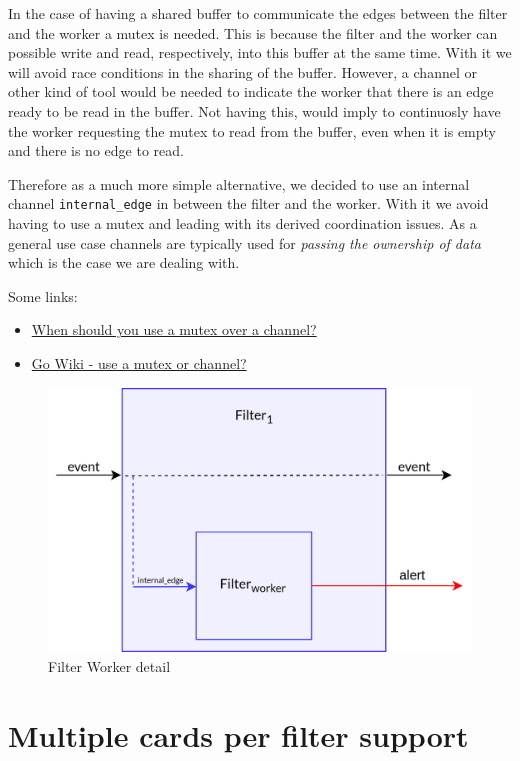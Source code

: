 \documentclass{article}
\begin{document}
In the case of having a shared buffer to communicate the edges between the filter and the worker a mutex is needed. This is because the filter and the worker can possible write and read, respectively, into this buffer at the same time. With it we will avoid race conditions in the sharing of the buffer. However, a channel or other kind of tool would be needed to indicate the worker that there is an edge ready to be read in the buffer. Not having this, would imply to continuosly have the worker requesting the mutex to read from the buffer, even when it is empty and there is no edge to read. 

Therefore as a much more simple alternative, we decided to use an internal channel \texttt{internal\_edge} in between the filter and the worker. With it we avoid having to use a mutex and leading with its derived coordination issues. As a general use case channels are typically used for \emph{passing the ownership of data} which is the case we are dealing with.

Some links:
\begin{itemize}
  \item \href{https://stackoverflow.com/questions/47312029/when-should-you-use-a-mutex-over-a-channel}{When should you use a mutex over a channel?}
  \item \href{https://go.dev/wiki/MutexOrChannel}{Go Wiki - use a mutex or channel?}
\end{itemize}


\begin{figure}[H]
  \centering
  \includegraphics[scale = 0.7]{images/filter-worker.png}
  \caption{Filter Worker detail}
  \label{img:pipeline-schema}
\end{figure}


\section{Multiple cards per filter support}
\end{document}

